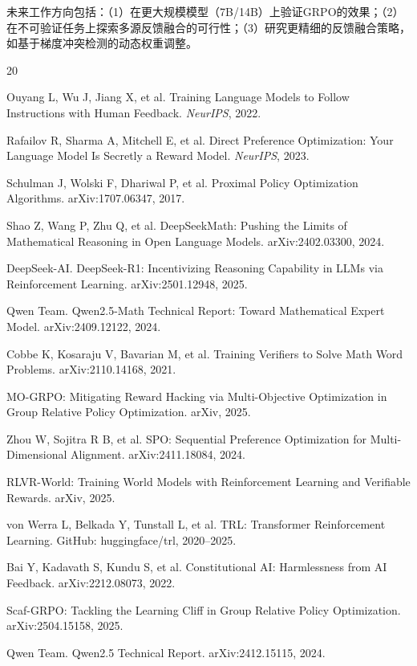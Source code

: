 \documentclass[10.5pt]{article}
\begin{document}
未来工作方向包括：（1）在更大规模模型（7B/14B）上验证GRPO的效果；（2）在不可验证任务上探索多源反馈融合的可行性；（3）研究更精细的反馈融合策略，如基于梯度冲突检测的动态权重调整。

\begin{thebibliography}{20}

Ouyang L, Wu J, Jiang X, et al. Training Language Models to Follow Instructions with Human Feedback. \textit{NeurIPS}, 2022.

Rafailov R, Sharma A, Mitchell E, et al. Direct Preference Optimization: Your Language Model Is Secretly a Reward Model. \textit{NeurIPS}, 2023.

Schulman J, Wolski F, Dhariwal P, et al. Proximal Policy Optimization Algorithms. arXiv:1707.06347, 2017.

Shao Z, Wang P, Zhu Q, et al. DeepSeekMath: Pushing the Limits of Mathematical Reasoning in Open Language Models. arXiv:2402.03300, 2024.

DeepSeek-AI. DeepSeek-R1: Incentivizing Reasoning Capability in LLMs via Reinforcement Learning. arXiv:2501.12948, 2025.

Qwen Team. Qwen2.5-Math Technical Report: Toward Mathematical Expert Model. arXiv:2409.12122, 2024.

Cobbe K, Kosaraju V, Bavarian M, et al. Training Verifiers to Solve Math Word Problems. arXiv:2110.14168, 2021.

MO-GRPO: Mitigating Reward Hacking via Multi-Objective Optimization in Group Relative Policy Optimization. arXiv, 2025.

Zhou W, Sojitra R B, et al. SPO: Sequential Preference Optimization for Multi-Dimensional Alignment. arXiv:2411.18084, 2024.

RLVR-World: Training World Models with Reinforcement Learning and Verifiable Rewards. arXiv, 2025.

von Werra L, Belkada Y, Tunstall L, et al. TRL: Transformer Reinforcement Learning. GitHub: huggingface/trl, 2020--2025.

Bai Y, Kadavath S, Kundu S, et al. Constitutional AI: Harmlessness from AI Feedback. arXiv:2212.08073, 2022.

Scaf-GRPO: Tackling the Learning Cliff in Group Relative Policy Optimization. arXiv:2504.15158, 2025.

Qwen Team. Qwen2.5 Technical Report. arXiv:2412.15115, 2024.

\end{thebibliography}
\end{document}

